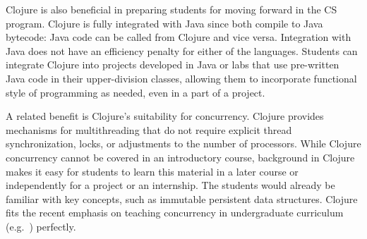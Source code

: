\documentclass[submission,copyright,creativecommons]{eptcs}
\newcommand{\allcomments}[1]{{#1}}
\newcommand{\elenacomment}[1]{{\bf \textcolor{ForestGreen}{\allcomments{{#1}}}}}
\newcommand{\stephencomment}[1]{{\bf \color{StephensBlue}{\allcomments{{#1}}}}} %
\newcommand{\joecomment}[1]{{\bf \color{JoesGold}{\allcomments{{#1}}}}}
\begin{document}
Clojure is also beneficial in preparing students for moving forward in the CS program. 
Clojure is fully integrated with Java since both compile to Java bytecode: Java code can be called from Clojure and vice versa.
Integration with Java does not have an efficiency penalty for either of the languages. 
Students can  integrate Clojure into projects developed in Java or labs that use pre-written Java code in their upper-division classes, allowing them to incorporate functional style of programming as needed, even in a part of a project. 

A related benefit is Clojure's suitability for concurrency. Clojure provides mechanisms for multithreading that do not require explicit thread synchronization,  locks, 
or adjustments to the number of processors. While Clojure concurrency cannot be  covered in an introductory course, background in Clojure makes it easy for students to learn this material in a later course or independently for a project or an internship.
The students would already be familiar with key concepts, such as immutable persistent data structures. Clojure fits the recent 
emphasis on teaching concurrency in undergraduate curriculum (e.g.~\cite{Brown:2010}) perfectly. 
\end{document}

